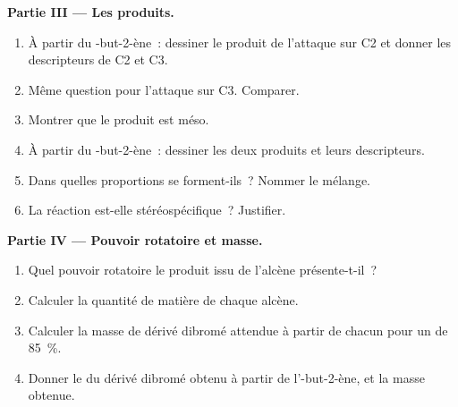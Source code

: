 \begin{problem}
\medskip
\noindent\textbf{Partie III --- Les produits.}
\begin{enumerate}[resume]
  \item À partir du -but-2-ène~: dessiner le produit de l'attaque
        sur C2 et donner les descripteurs de C2 et C3.
  \item Même question pour l'attaque sur C3. Comparer.
  \item Montrer que le produit est méso.
  \item À partir du -but-2-ène~: dessiner les deux produits et
        leurs descripteurs.
  \item Dans quelles proportions se forment-ils~? Nommer le mélange.
  \item La réaction est-elle stéréospécifique~? Justifier.
\end{enumerate}

\medskip
\noindent\textbf{Partie IV --- Pouvoir rotatoire et masse.}
\begin{enumerate}[resume]
  \item Quel pouvoir rotatoire le produit issu de l'alcène 
        présente-t-il~?
  \item Calculer la quantité de matière de chaque alcène.
  \item Calculer la masse de dérivé dibromé attendue à partir de chacun
        pour un  de \qty{85}{\percent}.
  \item Donner le  du dérivé dibromé obtenu à
        partir de l'-but-2-ène, et la masse obtenue.
\end{enumerate}
\end{problem}
